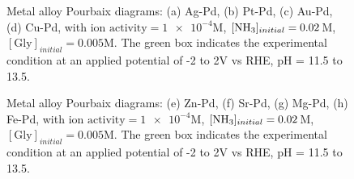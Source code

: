\documentclass[journal=jacsat,manuscript=article]{achemso}
\begin{document}
\begin{figure}[htbp]
\centering
{}
\caption{Metal alloy Pourbaix diagrams: (a) Ag-Pd, (b) Pt-Pd, (c) Au-Pd, (d) Cu-Pd, with $\text{ion activity}=\num{1e-4}$M, $[\ce{NH3}]_{initial}= 0.02$M, $[\text{Gly}]_{initial}=0.005$M. The green box indicates the experimental condition at an applied potential of -2 to 2V vs RHE, pH = 11.5 to 13.5.}
\label{fig:alloy_pourbaix_collage_3}
\end{figure}

\begin{figure}[htbp]
\centering
{}
\caption{Metal alloy Pourbaix diagrams: (e) Zn-Pd, (f) Sr-Pd, (g) Mg-Pd, (h) Fe-Pd, with $\text{ion activity}=\num{1e-4}$M, $[\ce{NH3}]_{initial}= 0.02$M, $[\text{Gly}]_{initial}=0.005$M. The green box indicates the experimental condition at an applied potential of -2 to 2V vs RHE, pH = 11.5 to 13.5.}
\label{fig:alloy_pourbaix_collage_4}
\end{figure}
\end{document}
